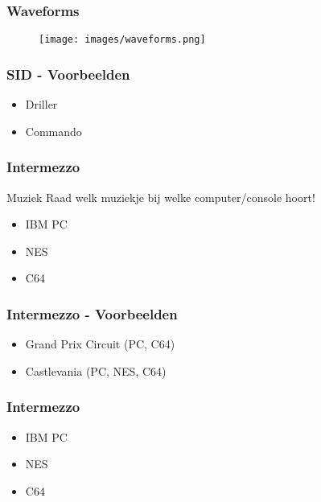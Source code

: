 \documentclass[aspectratio=43]{uva-inf-presentation}
\begin{document}

\begin{frame}
\frametitle{Waveforms}

\begin{figure}
\texttt{[image: images/waveforms.png]}
\end{figure}

\end{frame}


\begin{frame}
\frametitle{SID - Voorbeelden}

\begin{itemize}
\item Driller
\item Commando
\end{itemize}

\end{frame}


\begin{frame}
\frametitle{Intermezzo}

\begin{block}{Muziek}
Raad welk muziekje bij welke computer/console hoort!
\end{block}

\begin{itemize}
\item IBM PC
\item NES
\item C64
\end{itemize}

\end{frame}


\begin{frame}
\frametitle{Intermezzo - Voorbeelden}

\begin{itemize}
\item Grand Prix Circuit (PC, C64)
\item Castlevania (PC, NES, C64)
\end{itemize}

\end{frame}


\begin{frame}
\frametitle{Intermezzo}

\begin{itemize}
\item IBM PC
\item NES
\item C64
\end{itemize}

\end{frame}
\end{document}
